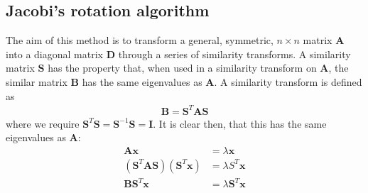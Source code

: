 \documentclass[11pt, a4paper]{article}
\newcommand{\A}{\mathbf{A}}
\renewcommand{\S}{\mathbf{S}}
\newcommand{\B}{\mathbf{B}}
\newcommand{\x}{\mathbf{x}}
\begin{document}
		\subsection{Jacobi's rotation algorithm}
		\label{subsec: jacobi algo}
			The aim of this method is to transform a general, symmetric, $n\times n$ matrix $\A$ into a diagonal matrix $\mathbf{D}$ through a series of similarity transforms. A similarity matrix $\S$ has the property that, when used in a similarity transform on $\A$, the similar matrix $\B$ has the same eigenvalues as $\A$. A similarity transform is defined as
			\begin{align*}
				\B = \S^T \A \S
			\end{align*}
			where we require $\S^T\S = \S^{-1}\S = \mathbf{I}$. It is clear then, that this has the same eigenvalues as $\A$:
			\begin{align*}
				\A \x &= \lambda \x \\
				(\S^T\A \S)(\S^T\x) &= \lambda S^T\x \\
				\B \S^T \x &= \lambda \S^T \x 
			\end{align*}
			
\end{document}
